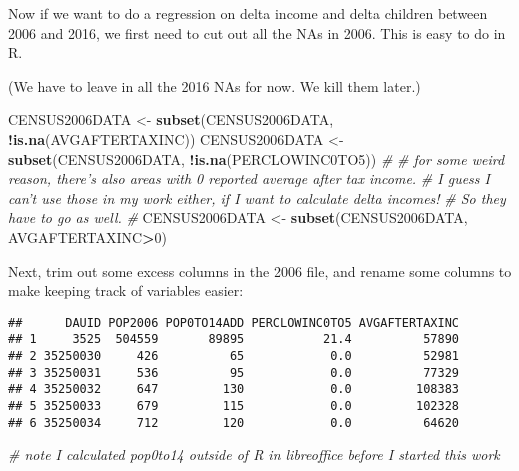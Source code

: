 \documentclass[]{article}
\newenvironment{Shaded}{\begin{snugshade}}{\end{snugshade}}
\newcommand{\CommentTok}[1]{\textcolor[rgb]{0.56,0.35,0.01}{\textit{#1}}}
\newcommand{\DecValTok}[1]{\textcolor[rgb]{0.00,0.00,0.81}{#1}}
\newcommand{\KeywordTok}[1]{\textcolor[rgb]{0.13,0.29,0.53}{\textbf{#1}}}
\newcommand{\NormalTok}[1]{#1}
\newcommand{\OperatorTok}[1]{\textcolor[rgb]{0.81,0.36,0.00}{\textbf{#1}}}
\newcommand{\StringTok}[1]{\textcolor[rgb]{0.31,0.60,0.02}{#1}}
\begin{document}
Now if we want to do a regression on delta income and delta children
between 2006 and 2016, we first need to cut out all the NAs in 2006.
This is easy to do in R.

(We have to leave in all the 2016 NAs for now. We kill them later.)

\begin{Shaded}
\begin{Highlighting}[]
\NormalTok{CENSUS2006DATA <-}\StringTok{ }\KeywordTok{subset}\NormalTok{(CENSUS2006DATA, }\OperatorTok{!}\KeywordTok{is.na}\NormalTok{(AVGAFTERTAXINC))}
\NormalTok{CENSUS2006DATA <-}\StringTok{ }\KeywordTok{subset}\NormalTok{(CENSUS2006DATA, }\OperatorTok{!}\KeywordTok{is.na}\NormalTok{(PERCLOWINC0TO5))}
\CommentTok{#}
\CommentTok{# for some weird reason, there's also areas with 0 reported average after tax income.}
\CommentTok{# I guess I can't use those in my work either, if I want to calculate delta incomes!}
\CommentTok{# So they have to go as well.}
\CommentTok{#}
\NormalTok{CENSUS2006DATA <-}\StringTok{ }\KeywordTok{subset}\NormalTok{(CENSUS2006DATA, AVGAFTERTAXINC}\OperatorTok{>}\DecValTok{0}\NormalTok{)}
\end{Highlighting}
\end{Shaded}

Next, trim out some excess columns in the 2006 file, and rename some
columns to make keeping track of variables easier:

\begin{Shaded}
\end{Shaded}

\begin{verbatim}
##      DAUID POP2006 POP0TO14ADD PERCLOWINC0TO5 AVGAFTERTAXINC
## 1     3525  504559       89895           21.4          57890
## 2 35250030     426          65            0.0          52981
## 3 35250031     536          95            0.0          77329
## 4 35250032     647         130            0.0         108383
## 5 35250033     679         115            0.0         102328
## 6 35250034     712         120            0.0          64620
\end{verbatim}

\begin{Shaded}
\begin{Highlighting}[]
\CommentTok{# note I calculated pop0to14 outside of R in libreoffice before I started this work}
\end{Highlighting}
\end{Shaded}
\end{document}
